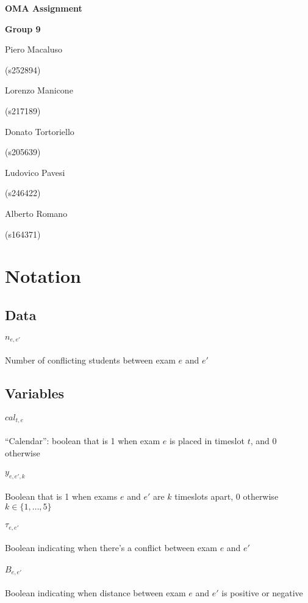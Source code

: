 \documentclass[11pt, a4paper, leqno]{article}
\newcommand{\nome}[2]{
\begin{minipage}[t]{0.185\linewidth}
	\centering #1\par
	\centering\small (#2)\par
\end{minipage}
}
\begin{document}
	
	\begin{center}
		{\huge\textbf{OMA Assignment}}\par
		\vspace{0.3em}
		{\large\textbf{Group 9}}\par
		\vspace{1em}
		\nome{Piero Macaluso}{s252894}
		\nome{Lorenzo Manicone}{s217189}
		\nome{Donato Tortoriello}{s205639}
		\nome{Ludovico Pavesi}{s246422}
		\nome{Alberto Romano}{s164371}
	\end{center}
	
	\section{Notation}
	
	\subsection{Data}
	
	\paragraph{$n_{e,e'}$} Number of conflicting students between exam $e$ and $e'$
	
	\subsection{Variables}
	
	\paragraph{$cal_{t,e}$} ``Calendar'': boolean that is 1 when exam $e$ is placed in timeslot $t$, and 0 otherwise
	
	\paragraph{$y_{e,e',k}$} Boolean that is 1 when exams $e$ and $e'$ are $k$ timeslots apart, 0 otherwise $k \in \{1,\dots,5\}$
	
	\paragraph{$\tau_{e,e'}$} Boolean indicating when there's a conflict between exam $e$ and $e'$
	
	\paragraph{$B_{e,e'}$} Boolean indicating when distance between exam $e$ and $e'$ is positive or negative
	
\end{document}

